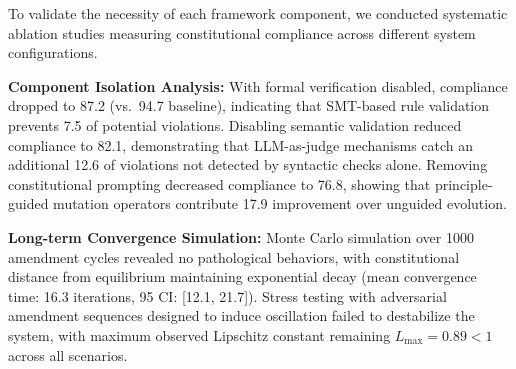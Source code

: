 To validate the necessity of each framework component, we conducted systematic ablation studies measuring constitutional compliance across different system configurations.

\textbf{Component Isolation Analysis:} With formal verification disabled, compliance dropped to 87.2\percent{} (vs.\ 94.7\percent{} baseline), indicating that SMT-based rule validation prevents 7.5\percent{} of potential violations. Disabling semantic validation reduced compliance to 82.1\percent{}, demonstrating that LLM-as-judge mechanisms catch an additional 12.6\percent{} of violations not detected by syntactic checks alone. Removing constitutional prompting decreased compliance to 76.8\percent{}, showing that principle-guided mutation operators contribute 17.9\percent{} improvement over unguided evolution.

\textbf{Long-term Convergence Simulation:} Monte Carlo simulation over 1000 amendment cycles revealed no pathological behaviors, with constitutional distance from equilibrium maintaining exponential decay (mean convergence time: 16.3 iterations, 95\percent{} CI: [12.1, 21.7]). Stress testing with adversarial amendment sequences designed to induce oscillation failed to destabilize the system, with maximum observed Lipschitz constant remaining $L_{\text{max}} = 0.89 < 1$ across all scenarios.
